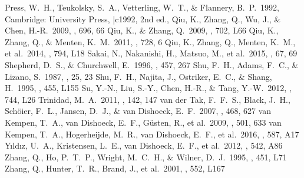 \documentclass[preprint2]{aastex}
\begin{document}
\begin{thebibliography}{}
 Press, W.~H., Teukolsky, S.~A., Vetterling, W.~T., \& Flannery, B.~P.\ 1992, Cambridge: University Press, |c1992, 2nd ed.,  
 Qiu, K., Zhang, Q., Wu, J., \& Chen, H.-R.\ 2009, \apj, 696, 66
 Qiu, K., \& Zhang, Q.\ 2009, \apjl, 702, L66
 Qiu, K., Zhang, Q., \& Menten, K.~M.\ 2011, \apj, 728, 6
 Qiu, K., Zhang, Q., Menten, K.~M., et al.\ 2014, \apjl, 794, L18 
 Sakai, N., Nakanishi, H., Matsuo, M., et al.\ 2015, \pasj, 67, 69
 Shepherd, D.~S., \& Churchwell, E.\ 1996, \apj, 457, 267 
 Shu, F.~H., Adams, F.~C., \& Lizano, S.\ 1987, \araa, 25, 23 
 Shu, F.~H., Najita, J., Ostriker, E.~C., \& Shang, H.\ 1995, \apjl, 455, L155 
 Su, Y.-N., Liu, S.-Y., Chen, H.-R., \& Tang, Y.-W.\ 2012, \apjl, 744, L26 
 Trinidad, M.~A.\ 2011, \aj, 142, 147 
 van der Tak, F.~F.~S., Black, J.~H., Sch{\"o}ier, F.~L., Jansen, D.~J., \& van Dishoeck, E.~F.\ 2007, \aap, 468, 627
 van Kempen, T.~A., van Dishoeck, E.~F., G{\"u}sten, R., et al.\ 2009, \aap, 501, 633 
 van Kempen, T.~A., Hogerheijde, M.~R., van Dishoeck, E.~F., et al.\ 2016, \aap, 587, A17
 Y{\i}ld{\i}z, U.~A., Kristensen, L.~E., van Dishoeck, E.~F., et al.\ 2012, \aap, 542, A86
 Zhang, Q., Ho, P.~T.~P., Wright, M.~C.~H., \& Wilner, D.~J.\ 1995, \apjl, 451, L71 
 Zhang, Q., Hunter, T.~R., Brand, J., et al.\ 2001, \apjl, 552, L167 

\end{thebibliography}
\end{document}

